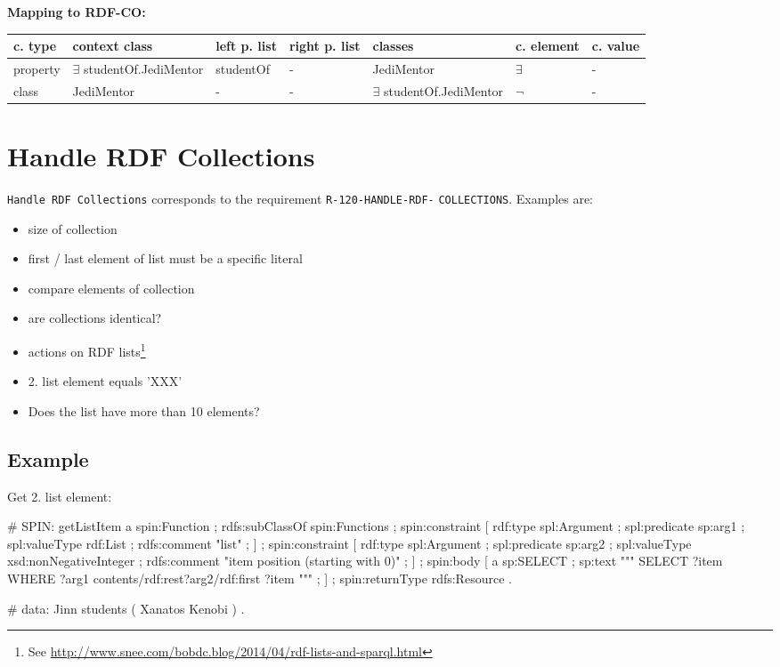 \documentclass{llncs}
\newcommand{\ms}[1]{\texttt{#1}}
\newenvironment{gcotable}{
  \scriptsize
  \sffamily
  \vspace{0cm}
	\begin{center}
	\textbf{\vspace{0.4cm}Mapping to RDF-CO:} \\
  \begin{tabular}{l|l|l|l|l|l|l}
	\hline
  \textbf{c. type} & \textbf{context class} & \textbf{left p. list} & \textbf{right p. list} & \textbf{classes} & \textbf{c. element} & \textbf{c. value} \\
  \hline

}{
  \hline
  \end{tabular}
	\end{center}
}
\begin{document}
\begin{gcotable}
property & $\exists$ studentOf.JediMentor & studentOf & - & JediMentor & $\exists$ & - \\
class & JediMentor & - & - & $\exists$ studentOf.JediMentor & $\neg$ & - \\
\end{gcotable}

\section{Handle RDF Collections}

\ms{Handle RDF Collections} corresponds to the requirement
\ms{R-120-HANDLE-RDF-} \ms{COLLECTIONS}.
Examples are:
\begin{itemize}
	\item size of collection
	\item first / last element of list must be a specific literal
	\item compare elements of collection
	\item are collections identical?
	\item actions on RDF lists\footnote{See \url{http://www.snee.com/bobdc.blog/2014/04/rdf-lists-and-sparql.html}}
	\item 2. list element equals 'XXX'
	\item Does the list have more than 10 elements?
\end{itemize}

\subsection{Example}

Get 2. list element:

\begin{ex}
# SPIN:
getListItem
    a spin:Function ; rdfs:subClassOf spin:Functions ;
    spin:constraint [
        rdf:type spl:Argument ;
        spl:predicate sp:arg1 ;
        spl:valueType rdf:List ;
        rdfs:comment "list" ; ] ;
    spin:constraint [
        rdf:type spl:Argument ;
        spl:predicate sp:arg2 ;
        spl:valueType xsd:nonNegativeInteger ;
        rdfs:comment "item position (starting with 0)" ; ] ;
    spin:body [
        a sp:SELECT ;
        sp:text """
            SELECT ?item
            WHERE {
                ?arg1 contents/rdf:rest{?arg2}/rdf:first ?item } """ ; ] ;
    spin:returnType rdfs:Resource .
\end{ex}

\begin{ex}
# data:
Jinn students 
     ( Xanatos Kenobi ) . 
\end{ex}
\end{document}

